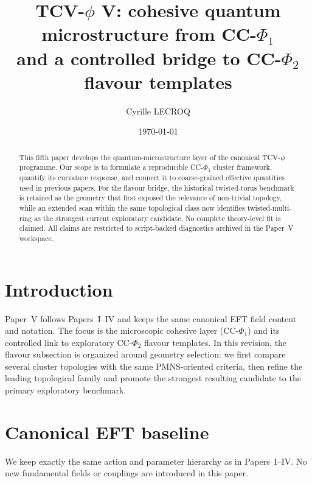 \documentclass[aps,prd,onecolumn,nofootinbib,superscriptaddress]{revtex4-2}
\begin{document}
\title{TCV-$\phi$ V: cohesive quantum microstructure from CC-$\Phi_1$ \\
and a controlled bridge to CC-$\Phi_2$ flavour templates}

\author{Cyrille LECROQ}

\date{\today}

\begin{abstract}
This fifth paper develops the quantum-microstructure layer of the canonical TCV-$\phi$ programme.
Our scope is to formulate a reproducible CC-$\Phi_1$ cluster framework, quantify its curvature response, and connect it to coarse-grained effective quantities used in previous papers.
For the flavour bridge, the historical twisted-torus benchmark is retained as the geometry that first exposed the relevance of non-trivial topology, while an extended scan within the same topological class now identifies twisted-multi-ring as the strongest current exploratory candidate.
No complete theory-level fit is claimed.
All claims are restricted to script-backed diagnostics archived in the Paper~V workspace.
\end{abstract}

\maketitle

\section{Introduction}
Paper~V follows Papers~I--IV and keeps the same canonical EFT field content and notation.
The focus is the microscopic cohesive layer (CC-$\Phi_1$) and its controlled link to exploratory CC-$\Phi_2$ flavour templates.
In this revision, the flavour subsection is organized around geometry selection:
we first compare several cluster topologies with the same PMNS-oriented criteria, then refine the leading topological family and promote the strongest resulting candidate to the primary exploratory benchmark.

\section{Canonical EFT baseline}
We keep exactly the same action and parameter hierarchy as in Papers~I--IV.
No new fundamental fields or couplings are introduced in this paper.
\end{document}
